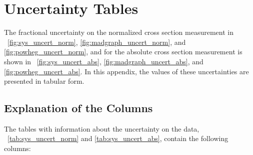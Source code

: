 \chapter{Uncertainty Tables}
\label{app:uncertainty_tables}

The fractional uncertainty on the normalized cross section measurement in
\FIGS~\ref{fig:sys_uncert_norm}, \ref{fig:madgraph_uncert_norm}, and
\ref{fig:powheg_uncert_norm}, and for the absolute cross section measurement is
shown in \FIGS~\ref{fig:sys_uncert_abs}, \ref{fig:madgraph_uncert_abs}, and
\ref{fig:powheg_uncert_abs}. In this appendix, the values of these
uncertainties are presented in tabular form.

\section{Explanation of the Columns}

The tables with information about the uncertainty on the data,
\TABS~\ref{tab:sys_uncert_norm} and \ref{tab:sys_uncert_abs}, contain the
following columns:

